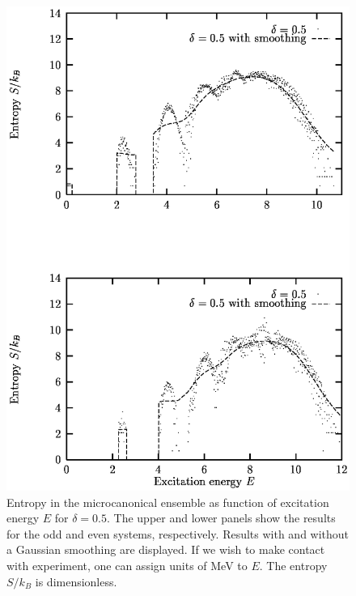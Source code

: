 \begin{figure}
\includegraphics[totalheight=20cm,angle=0,bb=0 20 350 730]{fig3.ps}
\caption{Entropy in the microcanonical ensemble as function of excitation energy $E$ for $\delta=0.5$. The upper and lower panels show the results for the odd and even systems, respectively. Results with and without a Gaussian smoothing are displayed.
If we wish to make contact with experiment, one can assign units of MeV to $E$.
The entropy $S/k_B$ is dimensionless.}
\label{fig:fig3}
\end{figure}


